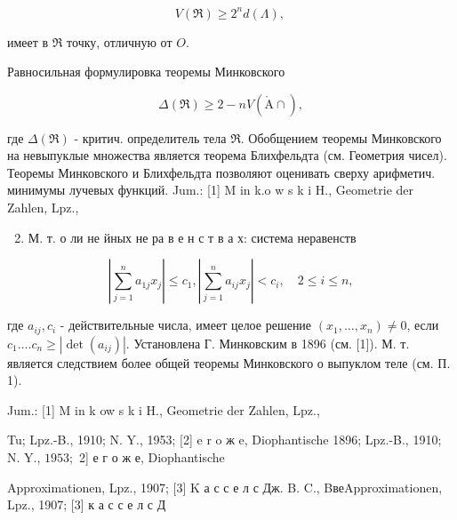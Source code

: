 \documentclass[10pt]{article}
\def\AA{\mathring{\mathrm{A}}}
\begin{document}
\[

V(\Re) \geqslant 2^{n} d(\Lambda) \text {, }

\]



имеет в $\mathfrak{\Re}$ точку, отличную от $O$.



Равносильная формулировка теоремы Минковского



\[

\Delta(\Re) \geqslant 2-n V(\AA \cap),

\]



где $\Delta(\mathfrak{\Re})$ - критич. определитель тела $\Re$. Обобщением теоремы Минковского на невыпуклые множества является теорема Блихфельдта (см. Геометрия чисел). Теоремы Минковского и Блихфельдта позволяют оценивать сверху арифметич. минимумы лучевых функций. Jum.: [1] M in k.o w s k i H., Geometrie der Zahlen, Lpz.,



\begin{enumerate}

  \setcounter{enumi}{1}

  \item М. т. о ли не йных не ра в е н с т в а х: система неравенств

\end{enumerate}



\[

\left|\sum_{j=1}^{n} a_{1 j} x_{j}\right| \leqslant c_{1},\left|\sum_{j=1}^{n} a_{i j} x_{j}\right|<c_{i}, \quad 2 \leqslant i \leqslant n,

\]



где $a_{i j}, c_{i}$ - действительные числа, имеет целое решение $\left(x_{1}, \ldots, x_{n}\right) \neq 0$, если $c_{1} \ldots . c_{n} \geqslant\left|\operatorname{det}\left(a_{i j}\right)\right|$. Установлена Г. Минковским в 1896 (см. [1]). М. т. является следствием более общей теоремы Минковского о выпуклом теле (см. П. 1).



Jum.: [1] M in k ow s k i H., Geometrie der Zahlen, Lpz.,

Tu; Lpz.-B., 1910; N. Y., 1953; [2] e r o ж e, Diophantische 1896; Lpz.-B., 1910; N. Y., $1953 ;$ 2] е г о ж е, Diophantische

Approximationen, Lpz., 1907; [3] K а с с е л с Дж. B. C., BвеApproximationen, Lpz., 1907; [3] к а с с е л с Д
\end{document}
